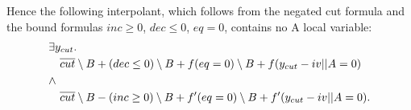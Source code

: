 \documentclass[a4paper]{article}
\begin{document}
Hence the following interpolant,
which follows from the negated cut formula and the bound formulas $inc\geq0$,
$dec\leq 0$, $eq = 0$,
contains no A local variable:
\begin{align*}
&\exists y_{cut}. \\
&\quad  \overline{cut}\setminus B + (dec \leq 0) \setminus B + f(eq = 0)\setminus B
  + f(y_{cut} - iv||{A} = 0)\\
&\land \\
&\quad  \overline{cut}\setminus B - (inc \geq 0) \setminus B + f'(eq = 0)\setminus B
  + f'(y_{cut} - iv||{A} = 0).
\end{align*}
\end{document}
